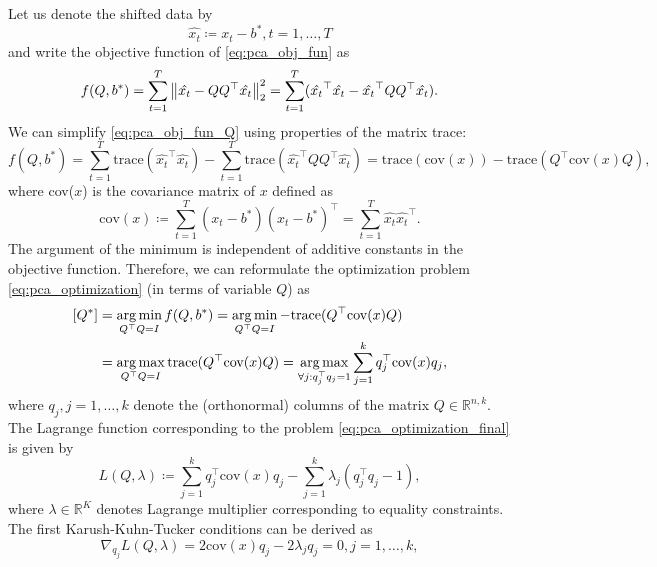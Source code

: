 Let us denote the shifted data by
\begin{equation}
    \hat{x_t} \coloneqq x_t - b^* , t=1, \dots, T
\end{equation}
and write the objective function of \eqref{eq:pca_obj_fun} as
\begin{equation}
    f(Q,b^*) = \sum_{t=1}^T \left\lVert\hat{x_t} - QQ^{\top}\hat{x_t}\right\rVert_2^2 = \sum_{t=1}^T (\hat{x_t}^{\top}\hat{x_t} - \hat{x_t}^{\top} QQ^{\top} \hat{x_t}).
    \label{eq:pca_obj_fun_Q}
\end{equation}
We can simplify \eqref{eq:pca_obj_fun_Q} using properties of the matrix trace:
\begin{equation}
    f(Q,b^*) = \sum_{t=1}^T \text{trace} (\hat{x_t}^{\top}\hat{x_t}) - \sum_{t=1}^T \text{trace} (\hat{x_t}^{\top} QQ^{\top} \hat{x_t})
    = \text{trace}(\text{cov}(x)) - \text{trace}(Q^{\top} \text{cov}(x) Q ),
\end{equation}
where cov($x$) is the covariance matrix of $x$ defined as
\begin{equation}
    \text{cov}(x) \coloneqq \sum_{t=1}^T(x_t-b^*)(x_t-b^*)^{\top} = \sum_{t=1}^T\hat{x_t}\hat{x_t}^{\top}.
\end{equation}
The argument of the minimum is independent of additive constants in the objective function. Therefore, we can reformulate the optimization problem \eqref{eq:pca_optimization} (in terms of variable $Q$) as
\begin{equation}
    \begin{split}
        [Q^*] &= \operatorname*{arg\,min}_{Q^{\top}Q=I} f(Q,b^*) = \operatorname*{arg\,min}_{Q^{\top}Q=I} -\text{trace}(Q^{\top}\text{cov}(x)Q) \\&= \operatorname*{arg\,max}_{Q^{\top}Q=I} \text{trace}(Q^{\top}\text{cov}(x)Q) = \operatorname*{arg\,max}_{\forall j:q_j^{\top}q_j=1} \sum_{j=1}^k q_j^{\top} \text{cov}(x) q_j,
    \end{split}
    \label{eq:pca_optimization_final}
\end{equation}
where $q_j , j=1,\dots,k$ denote the (orthonormal) columns of the matrix $Q \in \mathbb{R}^{n,k}$. The Lagrange function corresponding to the problem \eqref{eq:pca_optimization_final} is given by
\begin{equation}
    L(Q, \lambda) \coloneqq \sum_{j=1}^k q_j^{\top} \text{cov}(x)q_j - \sum_{j=1}^k \lambda_j (q_j^{\top} q_j - 1),
\end{equation}
where $\lambda \in \mathbb{R}^K$ denotes Lagrange multiplier corresponding to equality constraints. The first Karush-Kuhn-Tucker conditions can be derived as
\begin{equation}
    \nabla_{q_j}L(Q,\lambda) = 2 \text{cov}(x)q_j-2\lambda_jq_j=0, j=1,\dots,k,
\end{equation}
